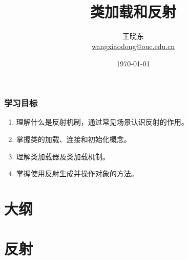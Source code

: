 
\title[KevinW@OUC]{\\  
  类加载和反射}
\author[王晓东]{王晓东\\
  \href{mailto:wangxiaodong@ouc.edu.cn}{\footnotesize wangxiaodong@ouc.edu.cn}}
\date{\today}


\frame{\titlepage}
\begin{frame}
\frametitle{学习目标}
\begin{enumerate}
\item 理解什么是反射机制，通过常见场景认识反射的作用。
\item 掌握类的加载、连接和初始化概念。
\item 理解类加载器及类加载机制。
\item 掌握使用反射生成并操作对象的方法。
\end{enumerate}  
\end{frame}
 
\section*{大纲}


\section{反射}

